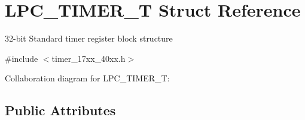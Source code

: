 \hypertarget{structLPC__TIMER__T}{}\section{L\+P\+C\+\_\+\+T\+I\+M\+E\+R\+\_\+T Struct Reference}
\label{structLPC__TIMER__T}


32-\/bit Standard timer register block structure  




{\ttfamily \#include $<$timer\+\_\+17xx\+\_\+40xx.\+h$>$}



Collaboration diagram for L\+P\+C\+\_\+\+T\+I\+M\+E\+R\+\_\+T\+:
\subsection*{Public Attributes}

